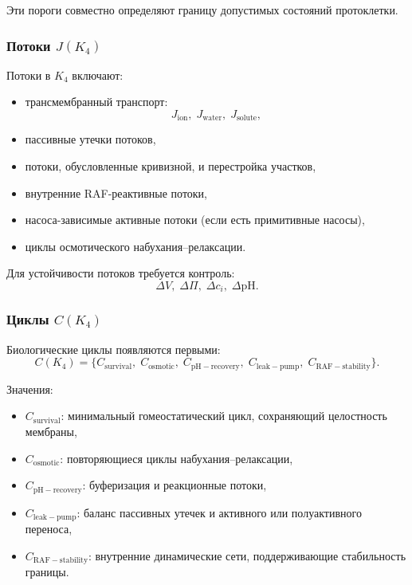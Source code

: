 Эти пороги совместно определяют границу допустимых состояний протоклетки.

\subsubsection{Потоки \texorpdfstring{$J(K_4)$}{J(K_4)}}

Потоки в $K_4$ включают:
\begin{itemize}
    \item трансмембранный транспорт:
          \[
          J_{\mathrm{ion}},\; J_{\mathrm{water}},\; J_{\mathrm{solute}},
          \]
    \item пассивные утечки потоков,
    \item потоки, обусловленные кривизной, и перестройка участков,
    \item внутренние RAF-реактивные потоки,
    \item насоса-зависимые активные потоки (если есть примитивные насосы),
    \item циклы осмотического набухания–релаксации.
\end{itemize}

Для устойчивости потоков требуется контроль:
\[
\Delta V,\; \Delta \Pi,\; \Delta c_i,\; \Delta \mathrm{pH}.
\]

\subsubsection{Циклы \texorpdfstring{$C(K_4)$}{C(K_4)}}

Биологические циклы появляются первыми:
\[
C(K_4) =
\{ C_{\mathrm{survival}},\;
   C_{\mathrm{osmotic}},\;
   C_{\mathrm{pH-recovery}},\;
   C_{\mathrm{leak-pump}},\;
   C_{\mathrm{RAF-stability}} \}.
\]

Значения:
\begin{itemize}
    \item $C_{\mathrm{survival}}$: минимальный гомеостатический цикл, сохраняющий
          целостность мембраны,
    \item $C_{\mathrm{osmotic}}$: повторяющиеся циклы набухания–релаксации,
    \item $C_{\mathrm{pH-recovery}}$: буферизация и реакционные потоки,
    \item $C_{\mathrm{leak-pump}}$: баланс пассивных утечек и активного
          или полуактивного переноса,
    \item $C_{\mathrm{RAF-stability}}$: внутренние динамические сети,
          поддерживающие стабильность границы.
\end{itemize}

